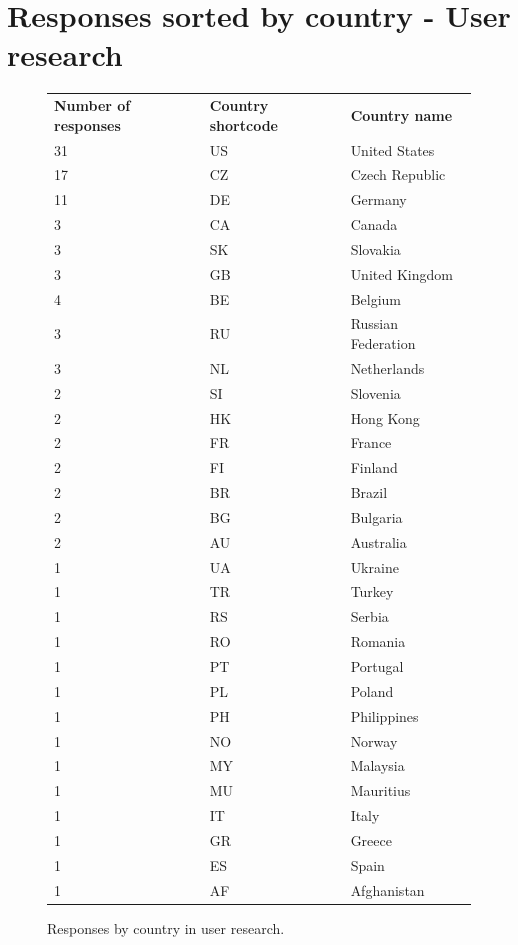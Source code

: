 \documentclass[
  printed, %
  table,   %
  lof,     %
  lot,     %
           oneside, color
]{fithesis3}
\begin{document}
\chapter{Responses sorted by country - User research}
\vspace{-1em}
\begin{figure}[H]
\center
\begin{footnotesize}
\begin{tabular}{lll}
\textbf{Number of responses} & \textbf{Country shortcode} & \textbf{Country name} \\
31 & US & United States      \\
17 & CZ & Czech Republic     \\
11 & DE & Germany            \\
3  & CA & Canada             \\
3  & SK & Slovakia           \\
3  & GB & United Kingdom     \\
4  & BE & Belgium            \\
3  & RU & Russian Federation \\
3  & NL & Netherlands        \\
2  & SI & Slovenia           \\
2  & HK & Hong Kong          \\
2  & FR & France             \\
2  & FI & Finland            \\
2  & BR & Brazil             \\
2  & BG & Bulgaria           \\
2  & AU & Australia          \\
1  & UA & Ukraine            \\
1  & TR & Turkey             \\
1  & RS & Serbia             \\
1  & RO & Romania            \\
1  & PT & Portugal           \\
1  & PL & Poland             \\
1  & PH & Philippines        \\
1  & NO & Norway             \\
1  & MY & Malaysia           \\
1  & MU & Mauritius          \\
1  & IT & Italy              \\
1  & GR & Greece             \\
1  & ES & Spain              \\
1  & AF & Afghanistan       
\end{tabular}
\end{footnotesize}
\caption{Responses by country in user research.}
\label{table:countries}
\end{figure}
\end{document}
